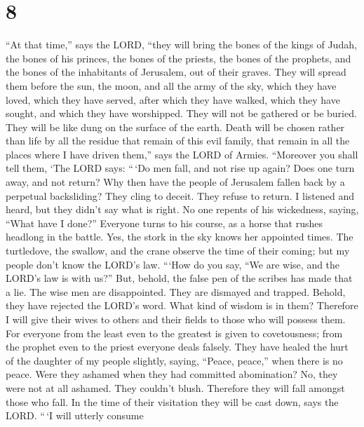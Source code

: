 \hypertarget{section-7}{%
\section{8}\label{section-7}}

 ``At that time,'' says the LORD, ``they will bring the
bones of the kings of Judah, the bones of his princes, the bones of the
priests, the bones of the prophets, and the bones of the inhabitants of
Jerusalem, out of their graves.  They will spread them
before the sun, the moon, and all the army of the sky, which they have
loved, which they have served, after which they have walked, which they
have sought, and which they have worshipped. They will not be gathered
or be buried. They will be like dung on the surface of the earth.
 Death will be chosen rather than life by all the residue
that remain of this evil family, that remain in all the places where I
have driven them,'' says the LORD of Armies.  ``Moreover you
shall tell them, `The LORD says: ``\,`Do men fall, and not rise up
again? Does one turn away, and not return?  Why then have
the people of Jerusalem fallen back by a perpetual backsliding? They
cling to deceit. They refuse to return.  I listened and
heard, but they didn't say what is right. No one repents of his
wickedness, saying, ``What have I done?'' Everyone turns to his course,
as a horse that rushes headlong in the battle.  Yes, the
stork in the sky knows her appointed times. The turtledove, the swallow,
and the crane observe the time of their coming; but my people don't know
the LORD's law.  ```How do you say, ``We are wise, and the
LORD's law is with us?'' But, behold, the false pen of the scribes has
made that a lie.  The wise men are disappointed. They are
dismayed and trapped. Behold, they have rejected the LORD's word. What
kind of wisdom is in them?  Therefore I will give their
wives to others and their fields to those who will possess them. For
everyone from the least even to the greatest is given to covetousness;
from the prophet even to the priest everyone deals falsely.
 They have healed the hurt of the daughter of my people
slightly, saying, ``Peace, peace,'' when there is no peace.
 Were they ashamed when they had committed abomination? No,
they were not at all ashamed. They couldn't blush. Therefore they will
fall amongst those who fall. In the time of their visitation they will
be cast down, says the LORD.  ``\,`I will utterly consume
